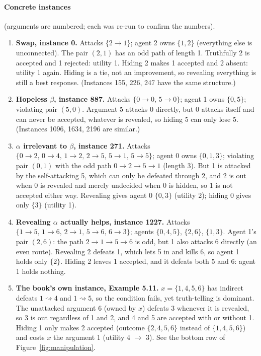 \documentclass[11pt,a4paper]{article}
\newcommand{\indirect}{\rightsquigarrow}
\begin{document}
\paragraph{Concrete instances} (arguments are numbered; each was re-run to confirm the numbers).
\begin{enumerate}
\item \textbf{Swap, instance 0.} Attacks $\{2\to1\}$; agent 2 owns $\{1,2\}$ (everything else is unconnected). The pair $(2,1)$ has
  an odd path of length 1. Truthfully 2 is accepted and 1 rejected: utility 1. Hiding 2 makes 1 accepted and 2 absent: utility 1
  again. Hiding is a tie, not an improvement, so revealing everything is still a best response. (Instances 155, 226, 247 have
  the same structure.)
\item \textbf{Hopeless $\beta$, instance 887.} Attacks $\{0\to0,\,5\to0\}$; agent 1 owns $\{0,5\}$; violating pair $(5,0)$. Argument 5
  attacks 0 directly, but 0 attacks itself and can never be accepted, whatever is revealed, so hiding 5 can only lose 5.
  (Instances 1096, 1634, 2196 are similar.)
\item \textbf{$\alpha$ irrelevant to $\beta$, instance 271.} Attacks $\{0\to2,\,0\to4,\,1\to2,\,2\to5,\,5\to1,\,5\to5\}$; agent 0 owns
  $\{0,1,3\}$; violating pair $(0,1)$ with the odd path $0\to2\to5\to1$ (length 3). But 1 is attacked by the self-attacking 5,
  which can only be defeated through 2, and 2 is out when 0 is revealed and merely undecided when 0 is hidden, so 1 is not accepted
  either way. Revealing gives agent 0 $\{0,3\}$ (utility 2); hiding 0 gives only $\{3\}$ (utility 1).
\item \textbf{Revealing $\alpha$ actually helps, instance 1227.} Attacks $\{1\to5,\,1\to6,\,2\to1,\,5\to6,\,6\to3\}$; agents
  $\{0,4,5\}$, $\{2,6\}$, $\{1,3\}$. Agent 1's pair $(2,6)$: the path $2\to1\to5\to6$ is odd, but 1 also attacks 6 directly (an even
  route). Revealing 2 defeats 1, which lets 5 in and kills 6, so agent 1 holds only $\{2\}$. Hiding 2 leaves 1 accepted, and it defeats
  both 5 and 6: agent 1 holds nothing.
\item \textbf{The book's own instance, Example 5.11.} $x=\{1,4,5,6\}$ has indirect defeats $1\indirect4$ and $1\indirect5$, so the
  condition fails, yet truth-telling is dominant. The unattacked argument 6 (owned by $x$) defeats 3 whenever it is revealed, so 3 is
  out regardless of 1 and 2, and 4 and 5 are accepted with or without 1. Hiding 1 only makes 2 accepted (outcome $\{2,4,5,6\}$
  instead of $\{1,4,5,6\}$) and costs $x$ the argument 1 (utility 4 $\to$ 3). See the bottom row of Figure~\ref{fig:manipulation}.
\end{enumerate}
\end{document}
